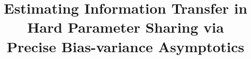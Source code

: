 \documentclass{article}
\newcommand*\samethanks[1][\value{footnote}]{\footnotemark[#1]}
\begin{document}
	\title{Estimating Information Transfer in Hard Parameter Sharing via Precise Bias-variance Asymptotics}
	\iffalse
	\vspace{0.15in}
	\author[1]{Hongyang R. Zhang\thanks{HZ and FY contributed equally to the theoretical results. SW conducted the experimental analysis. Correspondence to hrzhang@northeastern.edu or fyang75@wharton.upenn.edu.}}
	\author[2]{Fan Yang\samethanks}
	\author[3]{Sen Wu\samethanks}
	\author[2]{Weijie J. Su}
	\author[3]{Christopher R\'e}
	\vspace{0.15in}
	\affil[1]{Khoury College of Computer Sciences, Northeastern University}
	\affil[2]{Department of Statistics, The Wharton School, University of Pennsylvania}
	\affil[3]{Department of Computer Science, Stanford University}
	\fi

	\maketitle
	
	
	
	
    
	
	
	
	
\end{document}

